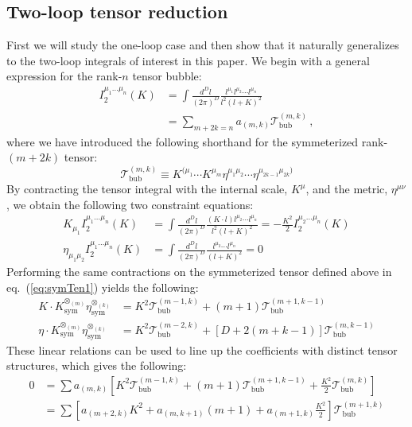 \documentclass[12pt,letter]{article}
\def\eqn#1{eq.~(\ref{#1})}
\begin{document}
\subsection{Two-loop tensor reduction}\label{sec:tenRed}
First we will study the one-loop case and then show that it naturally generalizes to the two-loop integrals of interest in this paper. We begin with a general expression for the rank-$n$ tensor bubble:
\begin{align}
     I^{\mu_1\dots \mu_n}_2(K)&= \int \frac{d^D l}{(2\pi)^D} \frac{l^{\mu_1}l^{\mu_2}\cdots l^{\mu_n} }{l^2(l+K)^2}
     \\
     &= \sum_{m+2k=n}a_{(m,k)} \mathcal{T}^{(m,k)}_{\text{bub}} \,,\label{tensorReductionBubble}
\end{align}
where we have introduced the following shorthand for the symmeterized rank-$(m+2k)$ tensor:
\begin{equation}\label{eq:symTen1}
\mathcal{T}^{(m,k)}_{\text{bub}}  \equiv K^{(\mu_1}\cdots K^{\mu_m}\eta^{\mu_1\mu_2}\cdots \eta^{\mu_{2k-1}\mu_{2k})}
\end{equation}
By contracting the tensor integral with the internal scale, $K^\mu$, and the metric, $\eta^{\mu\nu}$, we obtain the following two constraint equations:
\begin{align}
K_{\mu_1}I^{\mu_1\dots \mu_n}_2(K) &= \int \frac{d^D l}{(2\pi)^D} \frac{ (K\cdot l) l^{\mu_2}\cdots l^{\mu_n}}{l^2(l+K)^2}= -\frac{K^2}{2}I^{\mu_2\dots \mu_n}_2(K) 
\\
\eta_{\mu_1 \mu_2}I^{\mu_1\dots \mu_n}_2(K)&= \int \frac{d^D l}{(2\pi)^D} \frac{  l^{\mu_2}\cdots l^{\mu_n}}{(l+K)^2}=0
\end{align}
Performing the same contractions on the symmeterized tensor defined above in \eqn{eq:symTen1} yields the following:
\begin{align}
K\cdot K^{\otimes_{(m)}}_{\text{sym}}\eta_{\text{sym}}^{\otimes_{(k)}} &= K^2 \mathcal{T}^{(m-1,k)}_{\text{bub}} + (m+1)\mathcal{T}^{(m+1,k-1)}_{\text{bub}}
\\
\eta \cdot K^{\otimes_{(m)}}_{\text{sym}}\eta_{\text{sym}}^{\otimes_{(k)}} &= K^2 \mathcal{T}^{(m-2,k)}_{\text{bub}} + \left[D+2(m+k-1)\right]\mathcal{T}^{(m,k-1)}_{\text{bub}}
\end{align}
These linear relations can be used to line up the coefficients with distinct tensor structures, which gives the following:
\begin{align}
0&= \sum a_{(m,k)}\left[K^2 \mathcal{T}^{(m-1,k)}_{\text{bub}}+ (m+1)\mathcal{T}^{(m+1,k-1)}_{\text{bub}} +\frac{K^2}{2}\mathcal{T}^{(m,k)}_{\text{bub}}\right]
\\
&= \sum \left[a_{(m+2,k)} K^2 + a_{(m,k+1)} (m+1) +a_{(m+1,k)}\frac{K^2}{2}\right]\mathcal{T}^{(m+1,k)}_{\text{bub}}\end{align}
\end{document}
